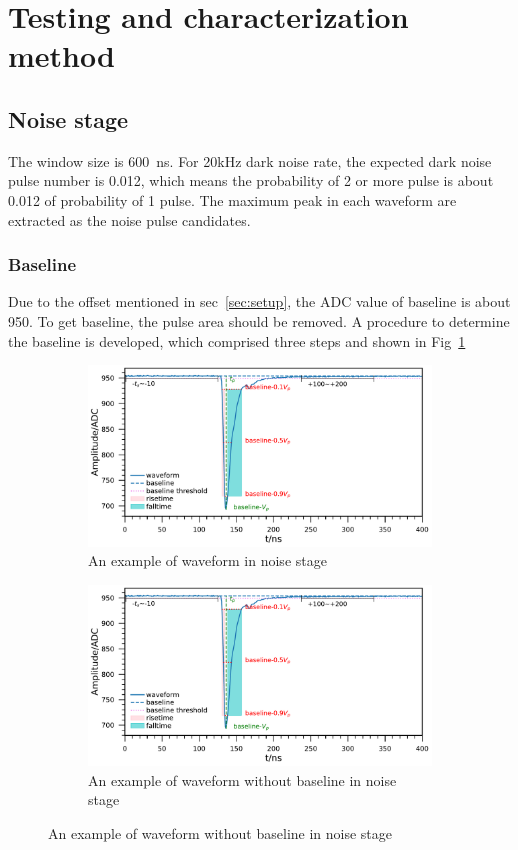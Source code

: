 \section{Testing and characterization method}
\label{Method}

\subsection{Noise stage}
The window size is \SI{600}{ns}. For 20kHz dark noise rate, the expected dark noise pulse number is 0.012, which means the probability of 2 or more pulse is about 0.012 of probability of 1 pulse. The maximum peak in each waveform are extracted as the noise pulse candidates.
\subsubsection{Baseline}
Due to the offset mentioned in sec~\ref{sec:setup}, the ADC value of baseline is about 950. To get baseline, the pulse area should be removed. A procedure to determine the baseline is developed, which comprised three steps and shown in Fig~\ref{fig:baseline1}
\begin{figure}[!htbp]
    \centering
    \begin{subfigure}[b]{\textwidth}
        \includegraphics[width=\textwidth,page=1]{figures/method/noisebaseline697_219908_2.pdf}
        \caption{An example of waveform in noise stage}
        \label{fig:baseline1}
    \end{subfigure}
    \begin{subfigure}[b]{\textwidth}
        \includegraphics[width=\textwidth,page=3]{figures/method/noisebaseline697_219908_2.pdf}
        \caption{An example of waveform without baseline in noise stage}
        \label{fig:baseline2}
    \end{subfigure}
\end{figure}

